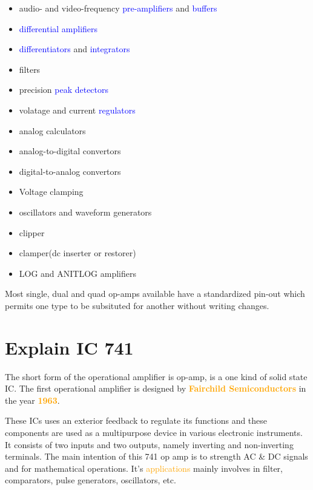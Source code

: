 \documentclass[11pt,a4paper,oneside]{article}
\begin{document}
	\begin{itemize}
		\item audio- and video-frequency \textcolor{blue}{pre-amplifiers} and \textcolor{blue}{buffers}
		\item \textcolor{blue}{differential amplifiers}
		\item \textcolor{blue}{differentiators} and \textcolor{blue}{integrators}
		\item filters
		\item precision \textcolor{blue}{peak detectors}
		\item volatage and current \textcolor{blue}{regulators}
		\item analog calculators
		\item analog-to-digital convertors
		\item digital-to-analog convertors
		\item Voltage clamping
		\item oscillators and waveform generators
		\item clipper
		\item clamper(dc inserter or restorer)
		\item LOG and ANITLOG amplifiers
	\end{itemize}

	Most single, dual and quad op-amps available have a standardized pin-out which permits one type to be subsituted for another without writing changes.

	\clearpage


	\section{Explain IC 741}

	The short form of the operational amplifier is op-amp, is a one kind of solid state IC. The first operational amplifier is designed by \textbf{\textcolor{orange}{Fairchild Semiconductors}} in the year \textbf{\textcolor{orange}{1963}}.

	These ICs uses an exterior feedback to regulate its functions and these components are used as a multipurpose device in various electronic instruments. It consists of two inputs and two outputs, namely inverting and non-inverting terminals. The main intention of this 741 op amp is to strength AC \& DC signals and for mathematical operations. It's \textcolor{orange}{applications} mainly involves in filter, comparators, pulse generators, oscillators, etc.
\end{document}
